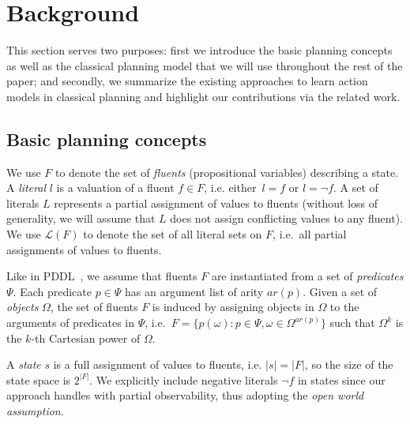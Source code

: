 
\section{Background}
\label{sec:background}

This section serves two purposes: first we introduce the basic planning concepts as well as the classical planning model that we will use throughout the rest of the paper; and secondly, we summarize the existing approaches to learn action models in classical planning and highlight our contributions via the related work.


\subsection{Basic planning concepts}
\label{basic_planning}


We use $F$ to denote the set of {\em fluents} (propositional variables) describing a state. A {\em literal} $l$ is a valuation of a fluent $f\in F$, i.e. either~$l=f$ or $l=\neg f$. A set of literals $L$ represents a partial assignment of values to fluents (without loss of generality, we will assume that $L$ does not assign conflicting values to any fluent). We use $\mathcal{L}(F)$ to denote the set of all literal sets on $F$, i.e.~all partial assignments of values to fluents.

Like in PDDL~\cite{fox2003pddl2}, we assume that fluents $F$ are instantiated from a set of {\em predicates} $\Psi$. Each predicate $p\in\Psi$ has an argument list of arity $ar(p)$. Given a set of {\em objects} $\Omega$, the set of fluents $F$ is induced by assigning objects in $\Omega$ to the arguments of predicates in $\Psi$, i.e.~$F=\{p(\omega):p\in\Psi,\omega\in\Omega^{ar(p)}\}$ such that $\Omega^k$ is the $k$-th Cartesian power of $\Omega$.

A {\em state} $s$ is a full assignment of values to fluents, i.e. $|s|=|F|$, so the size of the state space is $2^{|F|}$. We explicitly include negative literals $\neg f$ in states since our approach handles with partial observability, thus adopting the \emph{open world assumption}.


